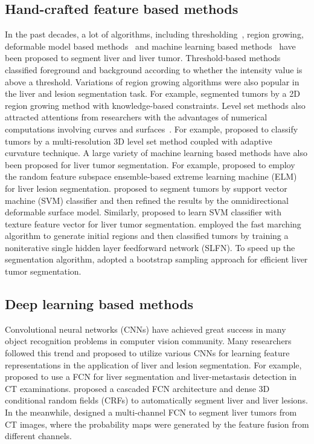 \documentclass[journal]{IEEEtran}
\begin{document}
\subsection{Hand-crafted feature based methods} In the past decades, a lot of algorithms, including thresholding~\citep{soler2001fully,moltz2008segmentation}, region growing, deformable model based methods~\citep{wong2008semi,jimenez2011optimal} and machine learning based methods~\citep{huang2014random,vorontsov2014metastatic,le2016liver,kuo2017texture,conze2017scale} have been proposed to segment liver and liver tumor. 
Threshold-based methods classified foreground and background according to whether the intensity value is above a threshold. 
Variations of region growing algorithms were also popular in the liver and lesion segmentation task. For example, \citet{wong2008semi} segmented tumors by a 2D region growing method with knowledge-based constraints. 
Level set methods also attracted attentions from researchers with the advantages of numerical computations involving curves and surfaces~\cite{hoogi2017adaptive}. For example, \citet{jimenez2011optimal} proposed to classify tumors by a multi-resolution 3D level set method coupled with adaptive curvature technique. 
A large variety of machine learning based methods have also been proposed for liver tumor segmentation. For example, \citet{huang2014random} proposed to employ the random feature subspace ensemble-based extreme  learning machine (ELM) for liver lesion segmentation. \citet{vorontsov2014metastatic} proposed to segment tumors by support vector machine (SVM) classifier and then refined the results by the omnidirectional deformable surface model. 
Similarly, \citet{kuo2017texture} proposed to learn SVM classifier with texture feature vector for liver tumor segmentation. 
\citet{le2016liver} employed the fast marching algorithm to generate initial regions and then classified tumors by training a noniterative single hidden layer feedforward network (SLFN).
To speed up the segmentation algorithm, \citet{chaieb2017accelerated} adopted a bootstrap sampling approach for efficient liver tumor segmentation.
\subsection{Deep learning based methods}

Convolutional neural networks (CNNs) have achieved great success in many object recognition problems in computer vision community.
Many researchers followed this trend and proposed to utilize various CNNs for learning feature representations in the application of liver and lesion segmentation.
For example, \citet{ben2016fully} proposed to use a FCN for liver segmentation and liver-metastasis detection in CT examinations. \citet{christ2016automatic,christ2017automatic} proposed a cascaded FCN architecture and dense 3D conditional random fields (CRFs) to automatically segment liver and liver lesions. In the meanwhile, \citet{sun2017automatic} designed a multi-channel FCN to segment liver tumors from CT images, where the probability maps were generated by the feature fusion from different channels. 
\end{document}
